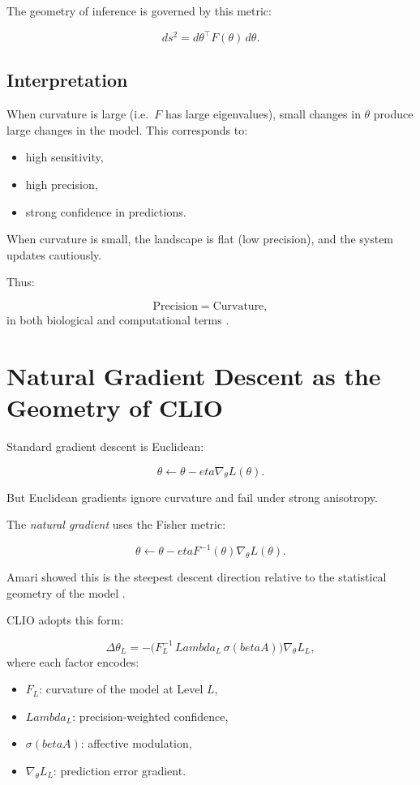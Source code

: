 \documentclass[12pt,oneside]{book}
\theoremstyle{plain}
\theoremstyle{definition}
\let\citep\parencite
\def\beta{beta}%
\def\eta{eta}%
\def\Lambda{Lambda}%
\begin{document}
The geometry of inference is governed by this metric:

\[
ds^2 = d\theta^\top F(\theta)\, d\theta.
\]

\subsection{Interpretation}

When curvature is large (i.e.\ $F$ has large eigenvalues), small changes in
$\theta$ produce large changes in the model.
This corresponds to:

\begin{itemize}
    \item high sensitivity,
    \item high precision,
    \item strong confidence in predictions.
\end{itemize}

When curvature is small, the landscape is flat (low precision), and the system
updates cautiously.

Thus:

\[
\text{Precision} = \text{Curvature},
\]
in both biological and computational terms
\citep{bogacz2017tutorial,friston2017active}.

\section{Natural Gradient Descent as the Geometry of CLIO}

Standard gradient descent is Euclidean:

\[
\theta \leftarrow \theta - \eta \nabla_\theta L(\theta).
\]

But Euclidean gradients ignore curvature and fail under strong anisotropy.

The \emph{natural gradient} uses the Fisher metric:

\[
\theta \leftarrow \theta - \eta F^{-1}(\theta) \nabla_\theta L(\theta).
\]

Amari showed this is the steepest descent direction relative to the
statistical geometry of the model \citep{amari1998natural}.

CLIO adopts this form:

\[
\Delta \theta_L
=
-\Big( F_L^{-1} \, \Lambda_L \, \sigma(\beta A) \Big)
\nabla_\theta L_L,
\]
where each factor encodes:

\begin{itemize}
    \item $F_L$: curvature of the model at Level $L$,
    \item $\Lambda_L$: precision-weighted confidence,
    \item $\sigma(\beta A)$: affective modulation,
    \item $\nabla_\theta L_L$: prediction error gradient.
\end{itemize}
\end{document}
